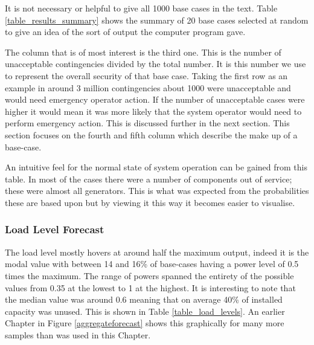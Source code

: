\documentclass[a4paper,oneside,12pt]{report}
\begin{document}
It is not necessary or helpful to give all 1000 base cases in the text. Table \ref{table_results_summary} shows the summary of 20 base cases selected at random to give an idea of the sort of output the computer program gave.

The column that is of most interest is the third one. This is the number of unacceptable contingencies divided by the total number. It is this number we use to represent the overall security of that base case. Taking the first row as an example in around 3 million contingencies about 1000 were unacceptable and would need emergency operator action. If the number of unacceptable cases were higher it would mean it was more likely that the system operator would need to perform emergency action. This is discussed further in the next section. This section focuses on the fourth and fifth column which describe the make up of a base-case.

An intuitive feel for the normal state of system operation can be gained from this table. In most of the cases there were a number of components out of service; these were almost all generators. This is what was expected from the probabilities these are based upon but by viewing it this way it becomes easier to visualise. 

\subsubsection{Load Level Forecast}

The load level mostly hovers at around half the maximum output, indeed it is the modal value with between 14 and 16\% of base-cases having a power level of 0.5 times the maximum. The range of powers spanned the entirety of the possible values from 0.35 at the lowest to 1 at the highest. It is interesting to note that the median value was around 0.6 meaning that on average 40\% of installed capacity was unused. This is shown in Table \ref{table_load_levels}. An earlier Chapter in Figure \ref{aggregateforecast} shows this graphically for many more samples than was used in this Chapter.
\end{document}
